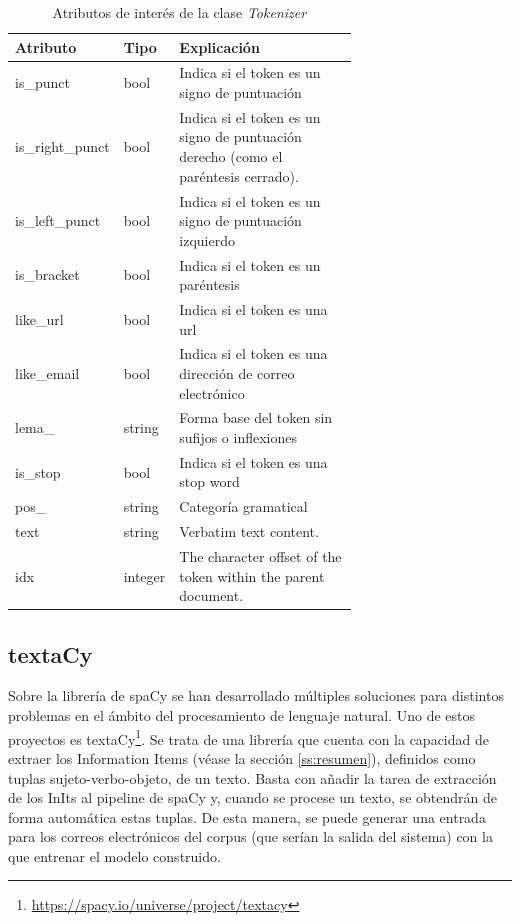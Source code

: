 \begin{table}[h]
	\begin{tabular}{|l|l|p{0.675\linewidth}|}
		\hline
		\textbf{Atributo} & \textbf{Tipo} & \textbf{Explicación}                                                                     \\ \hline
		is\_punct          & bool          & Indica si el token es un signo de puntuación \\ \hline
		is\_right\_punct   & bool          & Indica si el token es un signo de puntuación derecho (como el paréntesis cerrado). \\ \hline
		is\_left\_punct    & bool          & Indica si el token es un signo de puntuación izquierdo\\ \hline
		is\_bracket        & bool          & Indica si el token es un paréntesis\\ \hline
		like\_url          & bool          & Indica si el token es una url \\ \hline
		like\_email        & bool          & Indica si el token es una dirección de correo electrónico\\ \hline
		lema\_             & string        & Forma base del token sin sufijos o inflexiones\\ \hline
		is\_stop           & bool          & Indica si el token es una stop word\\ \hline
		pos\_              & string        & Categoría gramatical\\ \hline
		text & string & Verbatim text content. \\ \hline
		idx & integer & The character offset of the token within the parent document. \\ \hline
	\end{tabular}
	\caption{Atributos de interés de la clase \textit{Tokenizer}}\label{tab:attspacy}
\end{table}


\subsection{textaCy}\label{ss:textacy}

Sobre la librería de spaCy se han desarrollado múltiples soluciones para distintos problemas en el ámbito del procesamiento de lenguaje natural. Uno de estos proyectos es textaCy\footnote{\url{https://spacy.io/universe/project/textacy}}. Se trata de una librería que cuenta con la capacidad de extraer los Information Items (véase la sección \ref{ss:resumen}), definidos como tuplas sujeto-verbo-objeto, de un texto. Basta con añadir la tarea de extracción de los InIts al pipeline de spaCy y, cuando se procese un texto, se obtendrán de forma automática estas tuplas. De esta manera, se puede generar una entrada para los correos electrónicos del corpus (que serían la salida del sistema) con la que entrenar el modelo construido.

